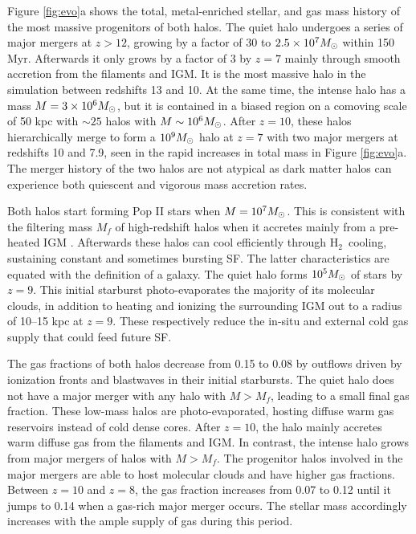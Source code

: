 \documentclass[12pt]{article}
\newcommand{\hh}{H$_2$}
\newcommand{\Ms}{\ifmmode{M_\odot}\else{$M_\odot$}\fi}
\begin{document}
Figure \ref{fig:evo}a shows the total, metal-enriched stellar, and gas
mass history of the most massive progenitors of both halos.  The quiet
halo undergoes a series of major mergers at $z > 12$, growing by a
factor of 30 to $2.5 \times 10^7 \Ms$ within 150 Myr.  Afterwards it
only grows by a factor of 3 by $z=7$ mainly through smooth accretion
from the filaments and IGM.  It is the most massive halo in the
simulation between redshifts 13 and 10.  At the same time, the intense
halo has a mass $M = 3 \times 10^6 \Ms$, but it is contained in a
biased region on a comoving scale of 50 kpc with $\sim25$ halos with
$M \sim 10^6 \Ms$.  After $z=10$, these halos hierarchically merge to
form a $10^9 \Ms$ halo at $z=7$ with two major mergers at redshifts 10
and 7.9, seen in the rapid increases in total mass in Figure
\ref{fig:evo}a.  The merger history of the two halos are not atypical
as dark matter halos can experience both quiescent and vigorous mass
accretion rates.

Both halos start forming Pop II stars when $M = 10^7 \Ms$.  This is
consistent with the filtering mass $M_f$ of high-redshift halos when
it accretes mainly from a pre-heated IGM \cite{gnedin98, gnedin00,
  Wise08_Gal}.  Afterwards these halos can cool efficiently through
\hh~cooling, sustaining constant and sometimes bursting SF.  The
latter characteristics are equated with the definition of a galaxy.
The quiet halo forms $10^5 \Ms$ of stars by $z=9$.  This initial
starburst photo-evaporates the majority of its molecular clouds, in
addition to heating and ionizing the surrounding IGM out to a radius
of 10--15 kpc at $z=9$.  These respectively reduce the in-situ and
external cold gas supply that could feed future SF.

The gas fractions of both halos decrease from 0.15 to 0.08 by outflows
driven by ionization fronts and blastwaves in their initial
starbursts.  The quiet halo does not have a major merger with any halo
with $M > M_f$, leading to a small final gas fraction.  These low-mass
halos are photo-evaporated, hosting diffuse warm gas reservoirs
instead of cold dense cores.  After $z=10$, the halo mainly accretes
warm diffuse gas from the filaments and IGM.  In contrast, the intense
halo grows from major mergers of halos with $M > M_f$.  The progenitor
halos involved in the major mergers are able to host molecular clouds
and have higher gas fractions.  Between $z=10$ and $z=8$, the gas
fraction increases from 0.07 to 0.12 until it jumps to 0.14 when a
gas-rich major merger occurs.  The stellar mass accordingly increases
with the ample supply of gas during this period.  
\end{document}
